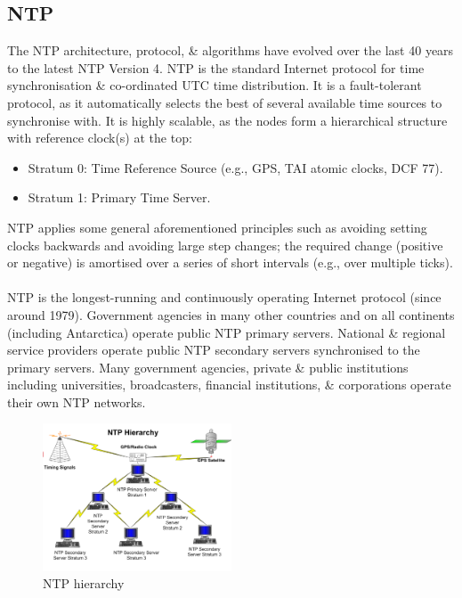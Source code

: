 \documentclass[a4paper,11pt]{article}
\begin{document}
\subsection{NTP}
The NTP architecture, protocol, \& algorithms have evolved over the last 40 years to the latest NTP Version 4.
NTP is the standard Internet protocol for time synchronisation \& co-ordinated UTC time distribution.
It is a fault-tolerant protocol, as it automatically selects the best of several available time sources to synchronise with.
It is highly scalable, as the nodes form a hierarchical structure with reference clock(s) at the top:
\begin{itemize}
    \item   Stratum 0: Time Reference Source (e.g., GPS, TAI atomic clocks, DCF 77).
    \item   Stratum 1: Primary Time Server.
\end{itemize}

NTP applies some general aforementioned principles such as avoiding setting clocks backwards and avoiding large step changes;
the required change (positive or negative) is amortised over a series of short intervals (e.g., over multiple ticks).
\\\\
NTP is the longest-running and continuously operating Internet protocol (since around 1979).
Government agencies in many other countries and on all continents (including Antarctica) operate public NTP primary servers.
National \& regional service providers operate public NTP secondary servers synchronised to the primary servers.
Many government agencies, private \& public institutions including universities, broadcasters, financial institutions, \& corporations operate their own NTP networks. 
\begin{figure}[H]
    \centering
    \includegraphics[width=0.5\textwidth]{./images/ntphierarchy.png}
    \caption{ NTP hierarchy }
\end{figure}
\end{document}
